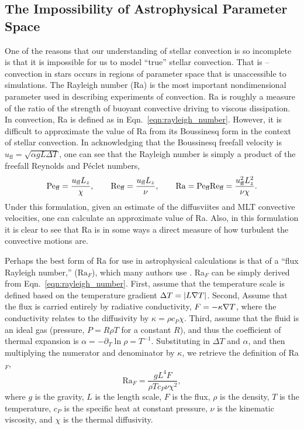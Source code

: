 \subsection{The Impossibility of Astrophysical Parameter Space}
\label{sct:nondimensional_parameters}
One of the reasons that our understanding of stellar convection is so incomplete is that it is impossible for us to model ``true'' stellar convection.
That is -- convection in stars occurs in regions of parameter space that is unaccessible to simulations.
The Rayleigh number (Ra) is the most important nondimensional parameter used in describing experiments of convection.
Ra is roughly a measure of the ratio of the strength of buoyant convective driving to viscous dissipation.
In \RB convection, Ra is defined as in Eqn.~\ref{eqn:rayleigh_number}.
However, it is difficult to approximate the value of Ra from its Boussinesq form in the context of stellar convection.
In acknowledging that the Boussinesq freefall velocity is $u_{\text{ff}} = \sqrt{\alpha g L \Delta T}$, one can see that the Rayleigh number is simply a product of the freefall Reynolds and P\'{e}clet numbers,
\begin{equation}
\text{Pe}_{\text{ff}} = \frac{u_{\text{ff}} L_z}{\chi}, \qquad
\text{Re}_{\text{ff}} = \frac{u_{\text{ff}} L_z}{\nu},  \qquad
\text{Ra} = \text{Pe}_{\text{ff}}\text{Re}_{\text{ff}} = \frac{u_{\text{ff}}^2 L_z^2}{\nu\chi}.
\end{equation}
Under this formulation, given an estimate of the diffusviites and MLT convective velocities, one can calculate an approximate value of Ra.
Also, in this formulation it is clear to see that Ra is in some ways a direct measure of how turbulent the convective motions are.

Perhaps the best form of Ra for use in astrophysical calculations is that of a ``flux Rayleigh number,'' ($\text{Ra}_F$), which many authors use \citep[e.g.,][]{featherstone&hindman2016a}.
Ra$_F$ can be simply derived from Eqn.~\ref{eqn:rayleigh_number}.
First, assume that the temperature scale is defined based on the temperature gradient $\Delta T = |L \nabla T|$.
Second, Assume that the flux is carried entirely by radiative conductivity, $F = -\kappa \nabla T$, where the conductivity relates to the diffusivity by $\kappa = \rho c_P \chi$.
Third, assume that the fluid is an ideal gas (pressure, $P = R\rho T$ for a constant $R$), and thus the coefficient of thermal expansion is $\alpha = -\partial_T \ln\rho  = T^{-1}$.
Substituting in $\Delta T$ and $\alpha$, and then multiplying the numerator and denominator by $\kappa$, we retrieve the definition of Ra$_F$,
\begin{equation}
\text{Ra}_F = \frac{g L^4 F}{\rho T c_P \nu \chi^2},
\end{equation}
where $g$ is the gravity, $L$ is the length scale, $F$ is the flux, $\rho$ is the density, $T$ is the temperature, $c_P$ is the specific heat at constant pressure, $\nu$ is the kinematic viscosity, and $\chi$ is the thermal diffusivity.

